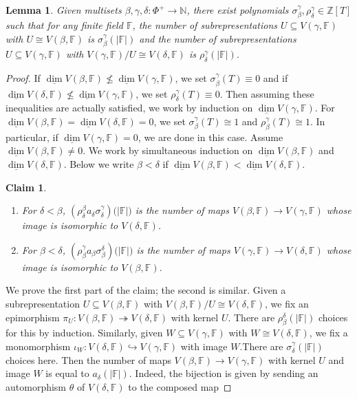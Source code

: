 \documentclass{book}
\newtheorem{lemma}[theorem]{Lemma}
\newtheorem{claim}[theorem]{Claim}
\begin{document}
    \begin{lemma}
        Given multisets $\beta,\gamma,\delta:\Phi^+\to\mathbb{N}$, there exist polynomials $\sigma_\beta^\gamma, \rho_\delta^\gamma\in\mathbb{Z}[T]$ such that for any finite field $\mathbb{F}$, the number of subrepresentations $U\subseteq V(\gamma,\mathbb{F})$ with $U\cong V(\beta,\mathbb{F})$ is $\sigma_\beta^\gamma(|\mathbb{F}|)$ and the number of subrepresentations $U\subseteq V(\gamma,\mathbb{F})$ with $V(\gamma,\mathbb{F})/U\cong  V(\delta,\mathbb{F})$ is $\rho_\delta^\gamma(|\mathbb{F}|).$
    \end{lemma}
    
    \begin{proof}
        If $\underline{\dim}V(\beta,\mathbb{F})\nleq \underline{\dim}V(\gamma,\mathbb{F})$, we set $\sigma_\beta^\gamma(T)\equiv 0$ and if $\underline{\dim}V(\delta,\mathbb{F})\nleq \underline{\dim}V(\gamma,\mathbb{F})$, we set $\rho_\delta^\gamma(T)\equiv 0$. Then assuming these inequalities are actually satisfied, we work by induction on $\underline{\dim}V(\gamma,\mathbb{F}).$ For $\underline{\dim}V(\beta,\mathbb{F})=\underline{\dim}V(\delta,\mathbb{F})=0$, we set $\sigma_\beta^\gamma (T)\cong 1$ and $\rho_\beta^\gamma (T)\cong 1$. In particular, if $\underline{\dim}V(\gamma,\mathbb{F})=0$, we are done in this case. Assume $\underline{\dim}V(\beta,\mathbb{F})\neq 0.$ We work by simultaneous induction on $\underline{\dim}V(\beta,\mathbb{F})$ and  $\underline{\dim}V(\delta,\mathbb{F})$. Below we write $\beta<\delta$ if $\underline{\dim}V(\beta,\mathbb{F})<\underline{\dim}V(\delta,\mathbb{F})$.
        \begin{claim}
            \begin{enumerate}
                \item For $\delta<\beta$, $(\rho_\delta^\beta a_\delta \sigma_\delta^\gamma)(|\mathbb{F|)}$ is the number of maps $V(\beta,\mathbb{F})\to V(\gamma,\mathbb{F})$ whose image is isomorphic to $V(\delta,\mathbb{F})$.
                \item For $\beta<\delta$,  $(\rho_\beta^\gamma a_\beta \sigma_\beta^\delta)(|\mathbb{F|)}$ is the number of maps $V(\gamma,\mathbb{F})\to V(\delta,\mathbb{F})$ whose image is isomorphic to $V(\beta,\mathbb{F})$.
            \end{enumerate}
        \end{claim}
        We prove the first part of the claim; the second is similar. Given a subrepresentation $U\subseteq V(\beta,\mathbb{F})$ with $V(\beta,\mathbb{F})/U\cong V(\delta,\mathbb{F})$, we fix an epimorphism $\pi_U:V(\beta,\mathbb{F})\twoheadrightarrow V(\delta,\mathbb{F})$ with kernel $U$. There are $\rho_\beta^\delta(|\mathbb{F}|)$ choices for this by induction. Similarly, given $W\subseteq V(\gamma,\mathbb{F})$ with $W\cong V(\delta,\mathbb{F})$, we fix a monomorphism $\iota_W:V(\delta,\mathbb{F})\hookrightarrow V(\gamma,\mathbb{F})$ with image $W$.There are $\sigma_\delta^\gamma(|\mathbb{F}|)$ choices here. Then the number of maps $V(\beta,\mathbb{F})\to V(\gamma,\mathbb{F})$ with kernel $U$ and image $W$ is equal to $a_\delta(|\mathbb{F}|)$. Indeed, the bijection is given by sending an automorphism $\theta$ of $V(\delta,\mathbb{F})$ to the composed map 

\end{proof}
\end{document}
